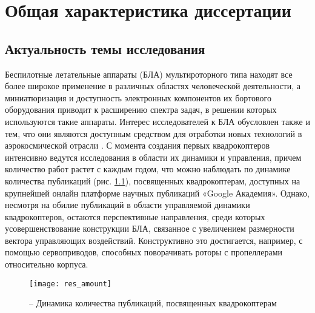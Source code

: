 
\chapter{Общая характеристика диссертации}

\section{Актуальность темы исследования}

Беспилотные летательные аппараты (БЛА) мультироторного типа находят все более широкое применение в различных областях человеческой деятельности, а миниатюризация и доступность электронных компонентов их бортового оборудования приводит к расширению спектра задач, в решении которых используются такие аппараты.
Интерес исследователей к БЛА обусловлен также и тем, что они являются доступным средством для отработки новых технологий в аэрокосмической отрасли \cite{Otero01}.
С момента создания первых квадрокоптеров интенсивно ведутся исследования в области их динамики и управления, причем количество работ растет с каждым годом, что можно наблюдать по динамике количества публикаций (рис. \ref{pic:res_amount}), посвященных квадрокоптерам, доступных на крупнейшей онлайн платформе научных публикаций «Google Академия».
Однако, несмотря на обилие публикаций в области управляемой динамики квадрокоптеров, остаются перспективные направления, среди которых усовершенствование конструкции БЛА, связанное с увеличением размерности вектора управляющих воздействий.
Конструктивно это достигается, например, с помощью сервоприводов, способных поворачивать роторы с пропеллерами относительно корпуса.
\begin{figure}[h!]
	\centering
	\texttt{[image: res\_amount]}
	\caption{ -- Динамика количества публикаций, посвященных квадрокоптерам}
	\label{pic:res_amount}
\end{figure}

